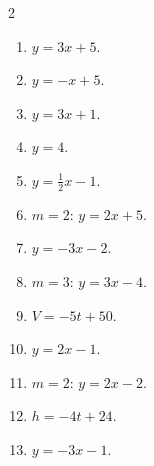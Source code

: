 \documentclass[11pt]{article}
\begin{document}
\begin{keybox}
\begin{multicols}{2}
\small
\begin{enumerate}[leftmargin=*,itemsep=3pt]
  \item $y=3x+5$.
  \item $y=-x+5$.
  \item $y=3x+1$.
  \item $y=4$.
  \item $y=\tfrac12x-1$.
  \item $m=2$: $y=2x+5$.
  \item $y=-3x-2$.
  \item $m=3$: $y=3x-4$.
  \item $V=-5t+50$.
  \item $y=2x-1$.
  \item $m=2$: $y=2x-2$.
  \item $h=-4t+24$.
  \item $y=-3x-1$.
\end{enumerate}
\end{multicols}
\end{keybox}
\end{document}
